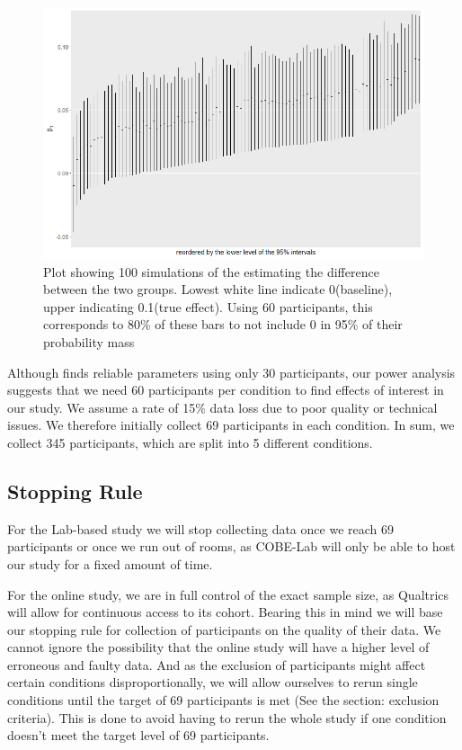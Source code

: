 \documentclass{article}
\begin{document}
\begin{figure}[H]
    \begin{centering}
    \includegraphics[width = \textwidth]{figures/estimates.png}
    \caption{Plot showing 100 simulations of the estimating the difference between the two groups. Lowest white line indicate 0(baseline), upper indicating 0.1(true effect). Using 60 participants, this corresponds to 80\% of these bars to not include 0 in 95\% of their probability mass}
    \end{centering}
\end{figure}

Although  finds reliable parameters using only 30 participants, our power analysis suggests that we need 60 participants per condition to find effects of interest in our study. We assume a rate of 15\% data loss due to poor quality or technical issues. We therefore initially collect 69 participants in each condition. In sum, we collect 345 participants, which are split into 5 different conditions. 
    \subsection{Stopping Rule}

    For the Lab-based study we will stop collecting data once we reach 69 participants or once we run out of rooms, as COBE-Lab will only be able to host our study for a fixed amount of time.

For the online study, we are in full control of the exact sample size, as Qualtrics will allow for continuous access to its cohort. Bearing this in mind we will base our stopping rule for collection of participants on the quality of their data. We cannot ignore the possibility that the online study will have a higher level of erroneous and faulty data. And as the exclusion of participants might affect certain conditions disproportionally, we will allow ourselves to rerun single conditions until the target of 69 participants is met (See the section: exclusion criteria).  This is done to avoid having to rerun the whole study if one condition doesn’t meet the target level of 69 participants.
\end{document}
